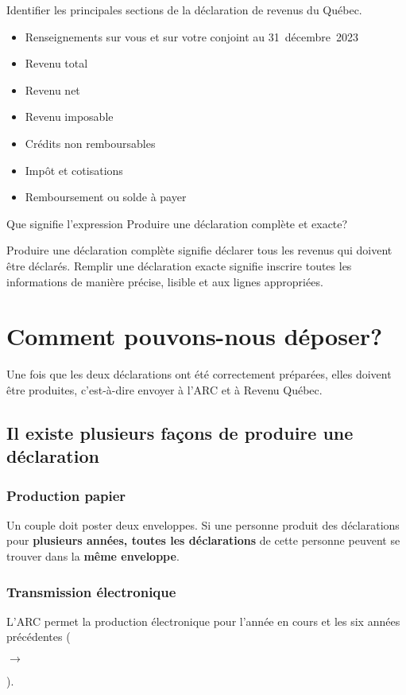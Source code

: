 \begin{question}
	Identifier les principales sections de la déclaration de revenus du Québec.
\end{question}
\begin{itemize}
	\item Renseignements sur vous et  sur votre conjoint au 31~décembre~2023
	\item Revenu total
	\item Revenu net
	\item Revenu imposable
	\item Crédits non remboursables
	\item Impôt et cotisations
	\item Remboursement ou solde à payer
\end{itemize}

\begin{question}
	Que signifie l'expression \og Produire une déclaration complète et exacte\fg{}?
\end{question}
Produire une déclaration complète signifie déclarer tous les revenus qui doivent être déclarés. Remplir une déclaration exacte signifie inscrire toutes les informations de manière précise, lisible et aux lignes appropriées.



\section{Comment pouvons-nous déposer?}
\begin{intro}
	Une fois que les deux déclarations ont été correctement préparées, elles doivent être produites, c'est-à-dire envoyer à l'ARC et à Revenu Québec.
\end{intro}


\subsection{Il existe plusieurs façons de produire une déclaration}
\subsubsection{Production papier}
Un couple doit poster deux enveloppes. Si une personne produit des déclarations pour \textbf{plusieurs années, toutes les déclarations} de cette personne peuvent se trouver dans la \textbf{même enveloppe}.

\subsubsection{Transmission électronique}
\setcounter{annee}{2023}
L'ARC permet la production électronique pour l'année en cours et les six années précédentes (\addtocounter{annee}{-6}\theannee{} $\rightarrow$ \addtocounter{annee}{6}\theannee{}).

